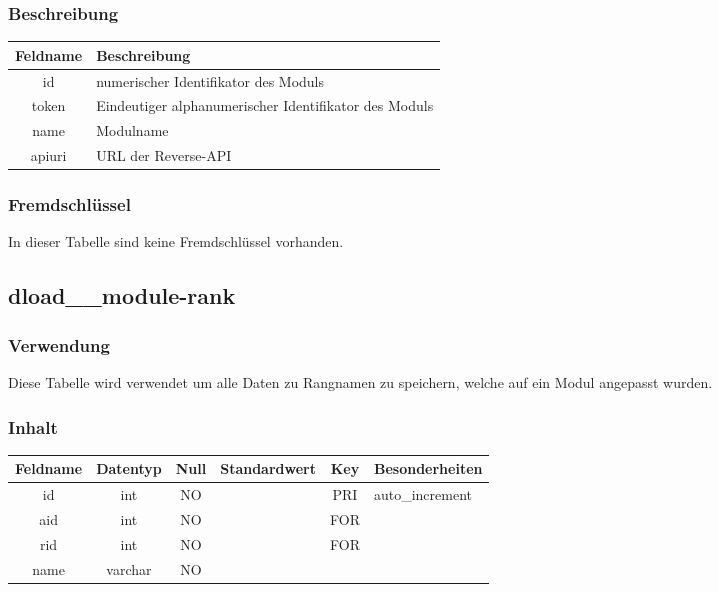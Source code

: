 \subsubsection{Beschreibung}
\begin{table}[H]
	\begin{tabular}{|c|p{12cm}|}
		\hline
		\textbf{Feldname} & \textbf{Beschreibung} \\ \hline
		id & numerischer Identifikator des Moduls \\ \hline
		token & Eindeutiger alphanumerischer Identifikator des Moduls \\ \hline
		name & Modulname \\ \hline
		apiuri & URL der Reverse-API \\ \hline
	\end{tabular}
\end{table}
\subsubsection{Fremdschlüssel}
In dieser Tabelle sind keine Fremdschlüssel vorhanden.
\subsection{dload\_\_module-rank}
\subsubsection{Verwendung} Diese Tabelle wird verwendet um alle Daten zu Rangnamen zu speichern, welche auf ein Modul angepasst wurden.
\subsubsection{Inhalt}
\begin{table}[H]
	\begin{tabular}{|c|c|c|c|c|p{3.5cm}|}
		\hline
		\textbf{Feldname} & \textbf{Datentyp} & \textbf{Null} & \textbf{Standardwert} & \textbf{Key}   & \textbf{Besonderheiten} \\ \hline
		id & int & NO &  & PRI & auto\_increment \\ \hline
		aid & int & NO &  & FOR & \\ \hline
		rid & int & NO &  & FOR & \\ \hline
		name & varchar & NO &  &  & \\ \hline
	\end{tabular}
\end{table}
